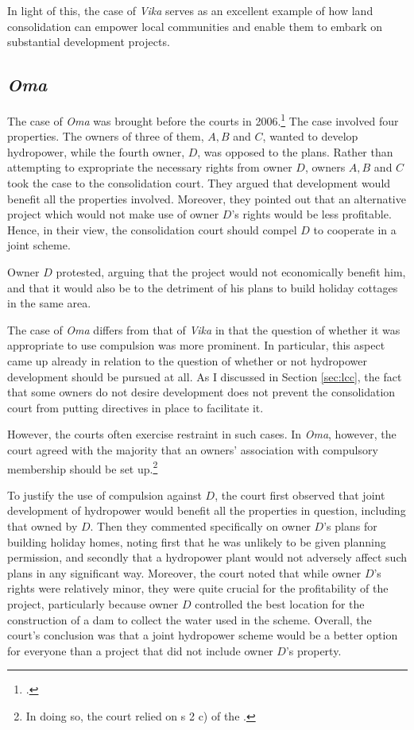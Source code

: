 In light of this, the case of \emph{Vika} serves as an excellent example of how land consolidation can empower local communities and enable them to embark on substantial development projects.

\subsection{\emph{Oma}}

The case of \emph{Oma} was brought before the courts in 2006.\footcite{oma06} The case involved four properties. The owners of three of them, $A,B$ and $C$, wanted to develop hydropower, while the fourth owner, $D$, was opposed to the plans. Rather than attempting to expropriate the necessary rights from owner $D$, owners $A,B$ and $C$ took the case to the consolidation court. They argued that development would benefit all the properties involved. Moreover, they  pointed out that an alternative project which would not make use of owner $D$'s rights would be less profitable. Hence, in their view, the consolidation court should compel $D$ to cooperate in a joint scheme. 

Owner $D$ protested, arguing that the project would not economically benefit him, and that it would also be to the detriment of his plans to build holiday cottages in the same area.

The case of \emph{Oma} differs from that of \emph{Vika} in that the question of whether it was appropriate to use compulsion was more prominent. In particular, this aspect came up already in relation to the question of whether or not hydropower development should be pursued at all. As I discussed in Section \ref{sec:lcc}, the fact that some owners do not desire development does not prevent the consolidation court from putting directives in place to facilitate it. 

However, the courts often exercise restraint in such cases. In \emph{Oma}, however, the court agreed with the majority that an owners' association with compulsory membership should be set up.\footnote{In doing so, the court relied on s 2 c) of the \cite{lca79}.}

To justify the use of compulsion against $D$, the court first observed that joint development of hydropower would benefit all the properties in question, including that owned by $D$. Then they commented specifically on owner $D$'s plans for building holiday homes, noting first that he was unlikely to be given planning permission, and secondly that a hydropower plant would not adversely affect such plans in any significant way. Moreover, the court noted that while owner $D$'s rights were relatively minor, they were quite crucial for the profitability of the project, particularly because owner $D$ controlled the best location for the construction of a dam to collect the water used in the scheme. Overall, the court's conclusion was that a joint hydropower scheme would be a better option for everyone than a project that did not include owner $D$'s property.

